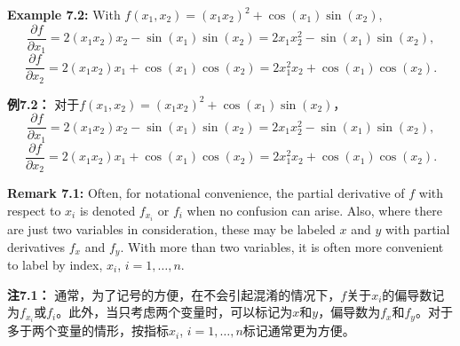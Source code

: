 \begin{original}
\textbf{Example 7.2:} With $f(x_1, x_2) = (x_1 x_2)^2 + \cos(x_1) \sin(x_2)$,
\[
\frac{\partial f}{\partial x_1} = 2(x_1 x_2) x_2 - \sin(x_1) \sin(x_2) = 2 x_1 x_2^2 - \sin(x_1) \sin(x_2),
\]
\[
\frac{\partial f}{\partial x_2} = 2(x_1 x_2) x_1 + \cos(x_1) \cos(x_2) = 2 x_1^2 x_2 + \cos(x_1) \cos(x_2).
\]
\end{original}
\begin{translation}
\textbf{例7.2：} 对于$f(x_1, x_2) = (x_1 x_2)^2 + \cos(x_1) \sin(x_2)$，
\[
\frac{\partial f}{\partial x_1} = 2(x_1 x_2) x_2 - \sin(x_1) \sin(x_2) = 2 x_1 x_2^2 - \sin(x_1) \sin(x_2),
\]
\[
\frac{\partial f}{\partial x_2} = 2(x_1 x_2) x_1 + \cos(x_1) \cos(x_2) = 2 x_1^2 x_2 + \cos(x_1) \cos(x_2).
\]
\end{translation}

\begin{original}
\textbf{Remark 7.1:} Often, for notational convenience, the partial derivative of $f$ with respect to $x_i$ is denoted $f_{x_i}$ or $f_i$ when no confusion can arise. Also, where there are just two variables in consideration, these may be labeled $x$ and $y$ with partial derivatives $f_x$ and $f_y$. With more than two variables, it is often more convenient to label by index, $x_i$, $i = 1, \dots, n$.
\end{original}
\begin{translation}
\textbf{注7.1：} 通常，为了记号的方便，在不会引起混淆的情况下，$f$关于$x_i$的偏导数记为$f_{x_i}$或$f_i$。此外，当只考虑两个变量时，可以标记为$x$和$y$，偏导数为$f_x$和$f_y$。对于多于两个变量的情形，按指标$x_i$, $i = 1, \dots, n$标记通常更为方便。
\end{translation}

